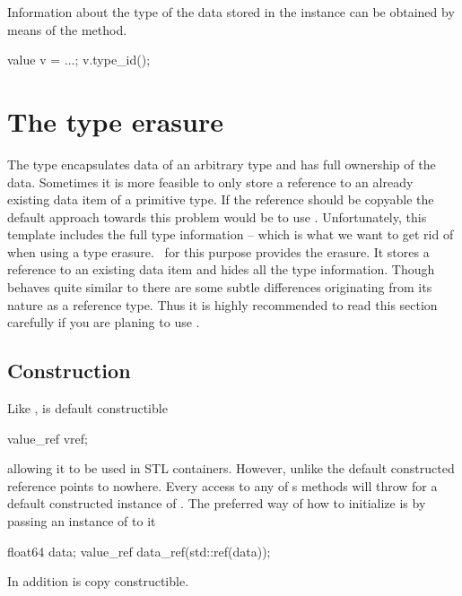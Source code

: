 Information about the type of the data stored in the  instance 
can be obtained by means of the  method. 
\begin{cppcode}
value v = ...;
v.type_id();
\end{cppcode}


\section{The  type erasure}

The  type encapsulates data of an arbitrary type and has full 
ownership of the data. Sometimes it is more feasible to only store a reference 
to an already existing data item of a primitive type. If the reference 
should be copyable the default approach towards this problem would be to use
. Unfortunately, this template includes the 
full type information -- which is what we want to get rid of when using 
a type erasure. 
\libpnicore\ for this purpose provides the  erasure. It stores 
a reference to an existing data item and hides all the type information. 
Though  behaves quite similar to  there are some 
subtle differences originating from its nature as a reference type. Thus it
is highly recommended to read this section carefully if you are planing to 
use .

\subsection{Construction}

Like ,  is default constructible
\begin{cppcode}
value_ref vref;
\end{cppcode}
allowing it to be used in STL containers. However, unlike  the default 
constructed reference points to nowhere. Every access to any of
s methods will throw  
for a default constructed instance of . The preferred way of 
how to initialize  is by passing an instance of 
 to it 
\begin{cppcode}
float64 data;
value_ref data_ref(std::ref(data));
\end{cppcode}
In addition  is copy constructible. 

